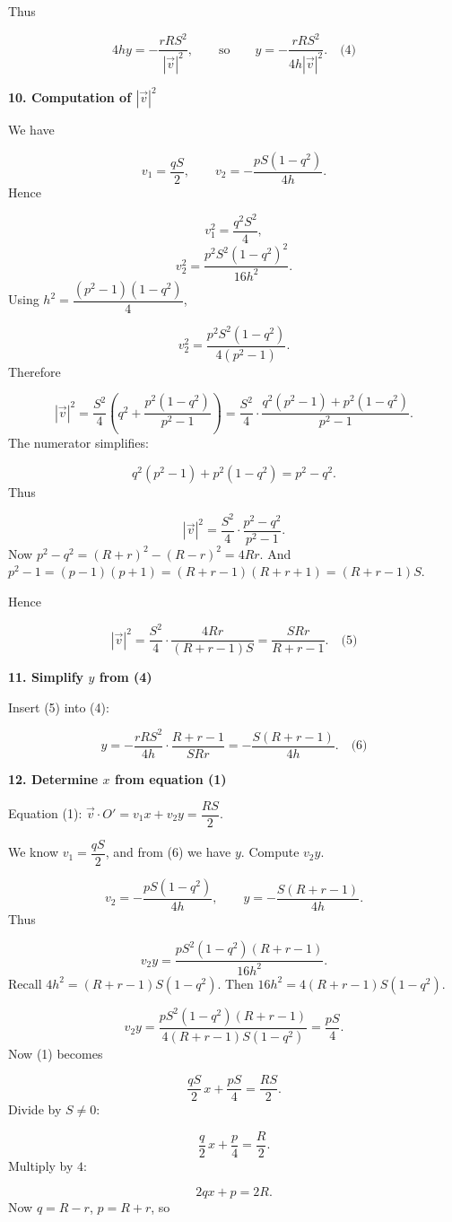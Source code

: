 \documentclass{llmxive}
\providecommand{\solutionheading}[1]{\par\smallskip\noindent\textbf{#1}\par}
\begin{document}
Thus\par
\[
4h y = -\frac{r R S^2}{|\vec{v}|^2},
\qquad\text{so}\qquad
y = -\frac{r R S^2}{4h |\vec{v}|^2}. \quad\text{(4)}
\]
\solutionheading{10. Computation of \(|\vec{v}|^2\)}
We have\par
\[
v_1 = \frac{q S}{2},\qquad v_2 = -\frac{p S (1 - q^2)}{4h}.
\]
Hence\par
\[
v_1^2 = \frac{q^2 S^2}{4},
\]
\[
v_2^2 = \frac{p^2 S^2 (1 - q^2)^2}{16 h^2}.
\]
Using \(h^2 = \dfrac{(p^2-1)(1 - q^2)}{4}\),\par
\[
v_2^2 = \frac{p^2 S^2 (1 - q^2)}{4(p^2 - 1)}.
\]
Therefore\par
\[
|\vec{v}|^2 = \frac{S^2}{4}\left(q^2 + \frac{p^2 (1 - q^2)}{p^2 - 1}\right)
= \frac{S^2}{4}\cdot \frac{q^2(p^2-1) + p^2(1 - q^2)}{p^2 - 1}.
\]
The numerator simplifies:\par
\[
q^2(p^2-1) + p^2(1 - q^2) = p^2 - q^2.
\]
Thus\par
\[
|\vec{v}|^2 = \frac{S^2}{4}\cdot \frac{p^2 - q^2}{p^2 - 1}.
\]
Now \(p^2 - q^2 = (R+r)^2 - (R-r)^2 = 4Rr.\) And \(p^2 - 1 = (p-1)(p+1) = (R+r-1)(R+r+1) = (R+r-1)S.\)\par
Hence\par
\[
|\vec{v}|^2 = \frac{S^2}{4}\cdot \frac{4Rr}{(R+r-1)S} = \frac{S R r}{R+r-1}. \quad\text{(5)}
\]
\solutionheading{11. Simplify \(y\) from (4)}
Insert (5) into (4):\par
\[
y = -\frac{r R S^2}{4h}\cdot \frac{R+r-1}{S R r} = -\frac{S (R+r-1)}{4h}. \quad\text{(6)}
\]
\solutionheading{12. Determine \(x\) from equation (1)}
Equation (1): \(\vec{v}\cdot O' = v_1 x + v_2 y = \dfrac{R S}{2}\).\par
We know \(v_1 = \dfrac{q S}{2}\), and from (6) we have \(y\). Compute \(v_2 y\).\par
\[
v_2 = -\frac{p S (1 - q^2)}{4h},\qquad y = -\frac{S (R+r-1)}{4h}.
\]
Thus\par
\[
v_2 y = \frac{p S^2 (1 - q^2) (R+r-1)}{16 h^2}.
\]
Recall \(4h^2 = (R+r-1) S (1 - q^2)\). Then \(16 h^2 = 4 (R+r-1) S (1 - q^2)\).\par
\[
v_2 y = \frac{p S^2 (1 - q^2) (R+r-1)}{4 (R+r-1) S (1 - q^2)} = \frac{p S}{4}.
\]
Now (1) becomes\par
\[
\frac{q S}{2}\, x + \frac{p S}{4} = \frac{R S}{2}.
\]
Divide by \(S \neq 0\):\par
\[
\frac{q}{2}\, x + \frac{p}{4} = \frac{R}{2}.
\]
Multiply by \(4\):\par
\[
2q x + p = 2R.
\]
Now \(q = R - r\), \(p = R + r\), so\par
\end{document}
